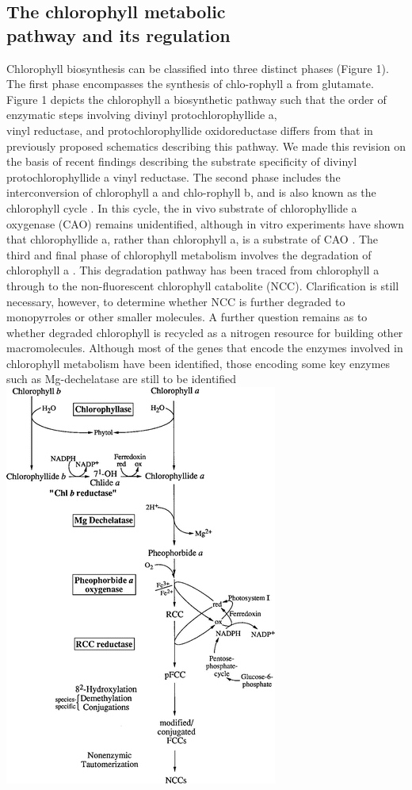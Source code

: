 \documentclass[a4paper, 11pt]{article}
\begin{document}
	\subsection{The chlorophyll metabolic\\ pathway and its regulation} 
	Chlorophyll biosynthesis can be classified into three distinct phases (Figure 1). The first phase encompasses the synthesis of chlo-rophyll a from glutamate. Figure 1 depicts the chlorophyll a biosynthetic pathway such that the order of enzymatic steps involving divinyl protochlorophyllide a, \\vinyl reductase, and protochlorophyllide oxidoreductase differs from that in previously proposed schematics describing this pathway. We made this revision on the basis of recent findings describing the substrate specificity of divinyl protochlorophyllide a vinyl reductase. The second phase includes the interconversion of chlorophyll a and chlo-rophyll b, and is also known as the chlorophyll cycle \cite{Rudiger2002}. In this cycle, the in vivo substrate of chlorophyllide a oxygenase (CAO) remains unidentified, although in vitro experiments have shown that chlorophyllide a, rather than chlorophyll a, is a substrate of CAO \cite{Oster2000}. The third and final phase of chlorophyll metabolism involves the degradation of chlorophyll a \cite{Takamiya2000}. This degradation pathway has been traced from chlorophyll a through to the non-fluorescent chlorophyll catabolite (NCC). Clarification is still necessary, however, to determine whether NCC is further degraded to monopyrroles or other smaller molecules. A further question remains as to whether degraded chlorophyll is recycled as a nitrogen resource for building other macromolecules. Although most of the genes that encode the enzymes involved in chlorophyll metabolism have been identified, those encoding some key enzymes such as Mg-dechelatase are still to be identified \cite{Tanaka2006}
	\includegraphics{figura2}
	
\end{document}
